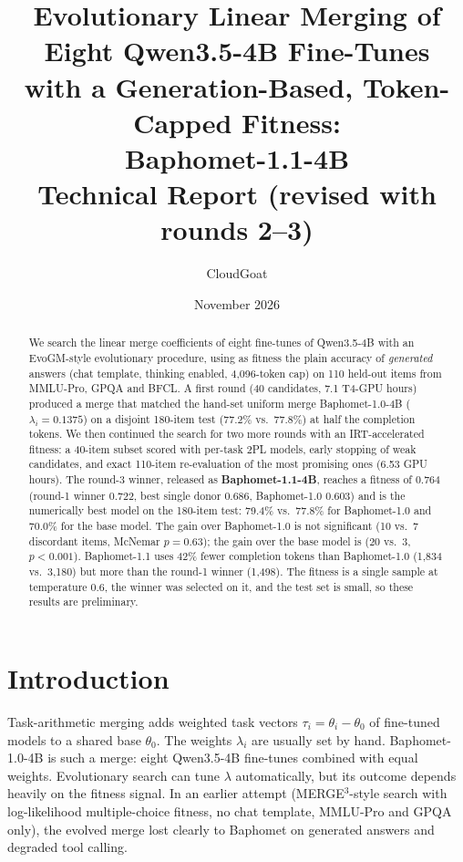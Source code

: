 \documentclass[10pt,a4paper]{article}
\title{\bfseries Evolutionary Linear Merging of Eight Qwen3.5-4B Fine-Tunes\\with a Generation-Based, Token-Capped Fitness:\\Baphomet-1.1-4B\\[2pt]\large Technical Report (revised with rounds 2--3)}
\author{CloudGoat}
\date{November 2026}
\begin{document}
\maketitle

\begin{abstract}
We search the linear merge coefficients of eight fine-tunes of Qwen3.5-4B with an EvoGM-style evolutionary procedure, using as fitness the plain accuracy of \emph{generated} answers (chat template, thinking enabled, 4{,}096-token cap) on 110 held-out items from MMLU-Pro, GPQA and BFCL. A first round (40 candidates, 7.1 T4-GPU hours) produced a merge that matched the hand-set uniform merge Baphomet-1.0-4B ($\lambda_i=0.1375$) on a disjoint 180-item test (77.2\% vs.\ 77.8\%) at half the completion tokens. We then continued the search for two more rounds with an IRT-accelerated fitness: a 40-item subset scored with per-task 2PL models, early stopping of weak candidates, and exact 110-item re-evaluation of the most promising ones (6.53 GPU hours). The round-3 winner, released as \textbf{Baphomet-1.1-4B}, reaches a fitness of 0.764 (round-1 winner 0.722, best single donor 0.686, Baphomet-1.0 0.603) and is the numerically best model on the 180-item test: 79.4\% vs.\ 77.8\% for Baphomet-1.0 and 70.0\% for the base model. The gain over Baphomet-1.0 is not significant (10 vs.\ 7 discordant items, McNemar $p=0.63$); the gain over the base model is (20 vs.\ 3, $p<0.001$). Baphomet-1.1 uses 42\% fewer completion tokens than Baphomet-1.0 (1{,}834 vs.\ 3{,}180) but more than the round-1 winner (1{,}498). The fitness is a single sample at temperature 0.6, the winner was selected on it, and the test set is small, so these results are preliminary.
\end{abstract}

\section{Introduction}
Task-arithmetic merging adds weighted task vectors $\tau_i=\theta_i-\theta_0$ of fine-tuned models to a shared base $\theta_0$. The weights $\lambda_i$ are usually set by hand. Baphomet-1.0-4B is such a merge: eight Qwen3.5-4B fine-tunes combined with equal weights. Evolutionary search can tune $\lambda$ automatically, but its outcome depends heavily on the fitness signal. In an earlier attempt (MERGE$^3$-style search with log-likelihood multiple-choice fitness, no chat template, MMLU-Pro and GPQA only), the evolved merge lost clearly to Baphomet on generated answers and degraded tool calling.
\end{document}
